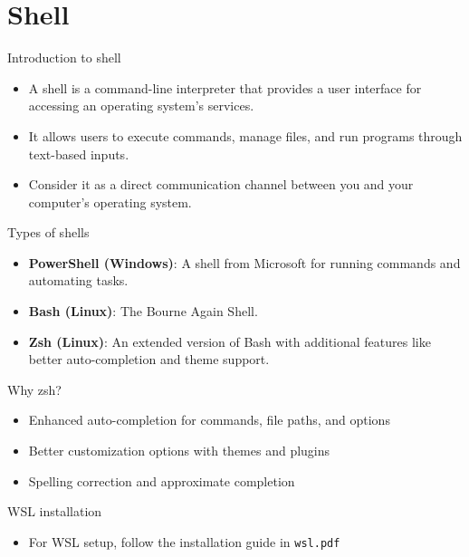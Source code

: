 \section{Shell}

\begin{frame}[fragile]{Introduction to shell}
	\begin{itemize}
		\item A shell is a command-line interpreter that provides a user interface for accessing an operating system's services.
		\item It allows users to execute commands, manage files, and run programs through text-based inputs.
		\item Consider it as a direct communication channel between you and your computer's operating system.
	\end{itemize}
\end{frame}

\begin{frame}[fragile]{Types of shells}
	\begin{itemize}
		\item \textbf{PowerShell (Windows)}: A shell from Microsoft for running commands and automating tasks.
		\item \textbf{Bash (Linux)}: The Bourne Again Shell.
		\item \textbf{Zsh (Linux)}: An extended version of Bash with additional features like better auto-completion and theme support.
	\end{itemize}
\end{frame}

\begin{frame}[fragile]{Why zsh?}
	\begin{itemize}
		\item Enhanced auto-completion for commands, file paths, and options
		\item Better customization options with themes and plugins
		\item Spelling correction and approximate completion
	\end{itemize}
\end{frame}

\begin{frame}[fragile]{WSL installation}
	\begin{itemize}
		\item For WSL setup, follow the installation guide in \texttt{wsl.pdf}
	\end{itemize}
\end{frame}

